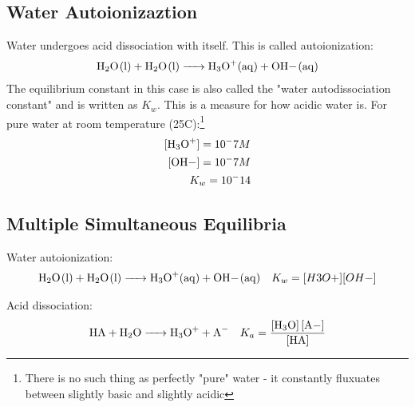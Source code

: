 \documentclass{article}  %
\begin{document}
\subsection*{Water Autoionizaztion}
Water undergoes acid dissociation with itself. This is called autoionization:
\begin{equation*}
    \begin{aligned}
        \ce{H2O_(l) + H2O_(l) -> H3O+_(aq) + OH-_(aq)}
    \end{aligned}
\end{equation*}
The equilibrium constant in this case is also called the "water autodissociation constant" and is written as $K_w$. This is a measure for how acidic water is.
\newline
For pure water at room temperature (25C):\footnote{There is no such thing as perfectly "pure" water - it constantly fluxuates between slightly basic and slightly acidic}
\begin{equation*}
    \begin{aligned}
        \ce{[H3O+]} = 10^-7 M \\
        \ce{[OH-]} = 10^-7 M \\
        K_w = 10^-14
    \end{aligned}
\end{equation*}



\subsection*{Multiple Simultaneous Equilibria}
Water autoionization:
\begin{equation*}
    \begin{aligned}
        \ce{H2O_(l) + H2O_(l) -> H3O+_(aq) + OH-_(aq)} \quad K_w = [H3O+][OH-]
    \end{aligned}
\end{equation*}

Acid dissociation: 
\begin{equation*}
    \begin{aligned}
        \ce{HA + H2O -> H3O+ + A-} \quad K_a = \ce{\frac{[H3O] [A-]}{[HA]}}
    \end{aligned}
\end{equation*}
\end{document}

